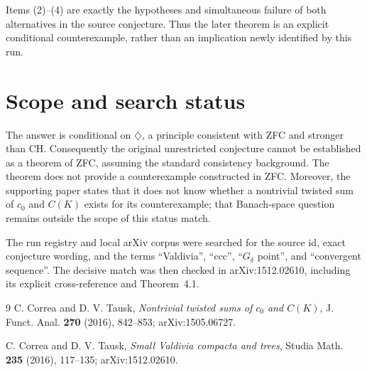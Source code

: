 \documentclass[11pt]{article}
\begin{document}
Items (2)--(4) are exactly the hypotheses and simultaneous failure of both
alternatives in the source conjecture. Thus the later theorem is an explicit
conditional counterexample, rather than an implication newly identified by
this run.

\clearpage
\null\vspace{0.15in}
\section{Scope and search status}

The answer is conditional on $\diamondsuit$, a principle consistent with
ZFC and stronger than CH. Consequently the original unrestricted conjecture
cannot be established as a theorem of ZFC, assuming the standard consistency
background. The theorem does not provide a counterexample constructed in ZFC.
Moreover, the supporting paper states that it does not know whether a
nontrivial twisted sum of $c_0$ and $C(K)$ exists for its counterexample;
that Banach-space question remains outside the scope of this status match.

The run registry and local arXiv corpus were searched for the source id,
exact conjecture wording, and the terms ``Valdivia'', ``ccc'',
``$G_\delta$ point'', and ``convergent sequence''. The decisive match was
then checked in arXiv:1512.02610, including its explicit cross-reference and
Theorem~4.1.

\begin{thebibliography}{9}
C. Correa and D. V. Tausk,
\emph{Nontrivial twisted sums of $c_0$ and $C(K)$},
J. Funct. Anal. \textbf{270} (2016), 842--853;
arXiv:1505.06727.

C. Correa and D. V. Tausk,
\emph{Small Valdivia compacta and trees},
Studia Math. \textbf{235} (2016), 117--135;
arXiv:1512.02610.
\end{thebibliography}
\end{document}

